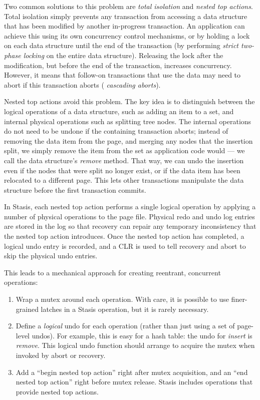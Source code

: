 \documentclass[letterpaper,twocolumn,10pt]{article}
\newcommand{\yad}{Stasis\xspace}
\begin{document}
Two common solutions to this problem are {\em total isolation} and
{\em nested top actions}.  Total isolation simply prevents any
transaction from accessing a data structure that has been modified by
another in-progress transaction.  An application can achieve this
using its own concurrency control mechanisms, or by holding a lock on
each data structure until the end of the transaction (by performing {\em strict two-phase locking} on the entire data structure).  
Releasing the
lock after the modification, but before the end of the transaction,
increases concurrency.  However, it means that follow-on transactions that use
the data may need to abort if this transaction aborts ({\em
cascading aborts}). 


Nested top actions avoid this problem.  The key idea is to distinguish
between the logical operations of a data structure, such as
adding an item to a set, and internal physical operations such as
splitting tree nodes. 
The internal operations do not need to be undone if the
containing transaction aborts; instead of removing the data item from
the page, and merging any nodes that the insertion split, we simply
remove the item from the set as application code would --- we call the
data structure's {\em remove} method.  That way, we can undo the
insertion even if the nodes that were split no longer exist, or if the
data item has been relocated to a different page.  This
lets other transactions manipulate the data structure before the first
transaction commits.

In \yad, each nested top action performs a single logical operation by applying
a number of physical operations to the page file.  Physical redo and undo log entries are stored in the log so that recovery can repair any
temporary inconsistency that the nested top action introduces.  Once
the nested top action has completed, a logical undo entry is recorded,
and a CLR is used to tell recovery and abort to skip the physical
undo entries.

This leads to a mechanical approach for creating reentrant, concurrent
operations:

\begin{enumerate}
\item Wrap a mutex around each operation.  With care, it is possible 
  to use finer-grained latches in a \yad operation, but it is rarely necessary.
\item Define a {\em logical} undo for each operation (rather than just
  using a set of page-level undos).  For example, this is easy for a
  hash table: the undo for {\em insert} is {\em remove}.  This logical
  undo function should arrange to acquire the mutex when invoked by
  abort or recovery.
\item Add a ``begin nested top action'' right after mutex
  acquisition, and an ``end nested top action'' right before mutex
  release.  \yad includes operations that provide nested top
  actions.
\end{enumerate}
\end{document}
